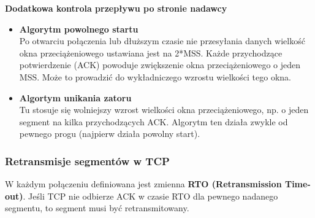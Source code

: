 \documentclass[../main.tex]{subfiles}
\begin{document}
    \textbf{Dodatkowa kontrola przepływu po stronie nadawcy}\\
    \begin{itemize}
        \item \textbf{Algorytm powolnego startu}\\
        Po otwarciu połączenia lub dłuższym czasie nie przesyłania danych wielkość okna
        przeciążeniowego ustawiana jest na 2*MSS. Każde przychodzące potwierdzenie (ACK)
        powoduje zwiększenie okna przeciążeniowego o jeden MSS. Może to prowadzić do wykładniczego wzrostu wielkości tego okna.
        \item \textbf{Algortym unikania zatoru}\\
        Tu stosuje się wolniejszy wzrost wielkości okna przeciążeniowego, np. o jeden
        segment na kilka przychodzących ACK. Algorytm ten działa zwykle od pewnego progu (najpierw działa powolny start).
    \end{itemize}


    \subsubsection{Retransmisje segmentów w TCP}
    W każdym połączeniu definiowana jest zmienna \textbf{RTO (Retransmission Time-out)}. Jeśli TCP nie
    odbierze ACK w czasie RTO dla pewnego nadanego segmentu, to segment musi być
    retransmitowany.
\end{document}
